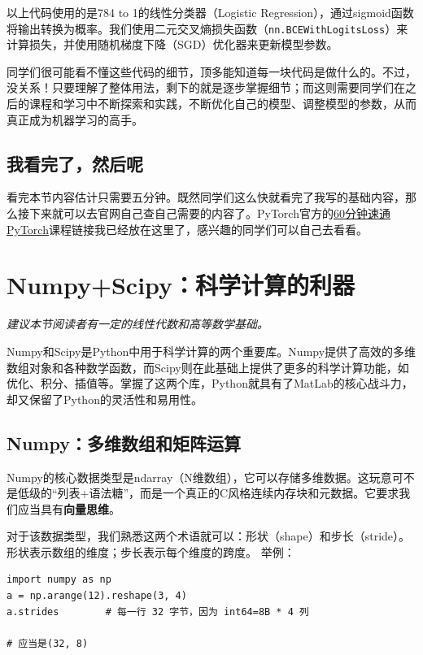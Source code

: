 \documentclass[../main.tex]{subfiles}
\begin{document}
以上代码使用的是784 to 1的线性分类器（Logistic Regression），通过sigmoid函数将输出转换为概率。我们使用二元交叉熵损失函数（\texttt{nn.BCEWithLogitsLoss}）来计算损失，并使用随机梯度下降（SGD）优化器来更新模型参数。

同学们很可能看不懂这些代码的细节，顶多能知道每一块代码是做什么的。不过，没关系！只要理解了整体用法，剩下的就是逐步掌握细节；而这则需要同学们在之后的课程和学习中不断探索和实践，不断优化自己的模型、调整模型的参数，从而真正成为机器学习的高手。

\subsection{我看完了，然后呢}

看完本节内容估计只需要五分钟。既然同学们这么快就看完了我写的基础内容，那么接下来就可以去官网自己查自己需要的内容了。PyTorch官方的\href{https://docs.pytorch.org/tutorials/beginner/deep_learning_60min_blitz.html}{60分钟速通PyTorch}课程链接我已经放在这里了，感兴趣的同学们可以自己去看看。

\section{Numpy+Scipy：科学计算的利器}

\begin{flushright}
    \emph{建议本节阅读者有一定的线性代数和高等数学基础。}
\end{flushright}

Numpy和Scipy是Python中用于科学计算的两个重要库。Numpy提供了高效的多维数组对象和各种数学函数，而Scipy则在此基础上提供了更多的科学计算功能，如优化、积分、插值等。掌握了这两个库，Python就具有了MatLab的核心战斗力，却又保留了Python的灵活性和易用性。

\subsection{Numpy：多维数组和矩阵运算}

Numpy的核心数据类型是ndarray（N维数组），它可以存储多维数据。这玩意可不是低级的“列表+语法糖”，而是一个真正的C风格连续内存块和元数据。它要求我们应当具有\textbf{向量思维}。

对于该数据类型，我们熟悉这两个术语就可以：形状（shape）和步长（stride）。形状表示数组的维度；步长表示每个维度的跨度。
举例：
\begin{lstlisting}
import numpy as np
a = np.arange(12).reshape(3, 4)
a.strides        # 每一行 32 字节，因为 int64=8B * 4 列

# 应当是(32, 8)
\end{lstlisting}
\end{document}
